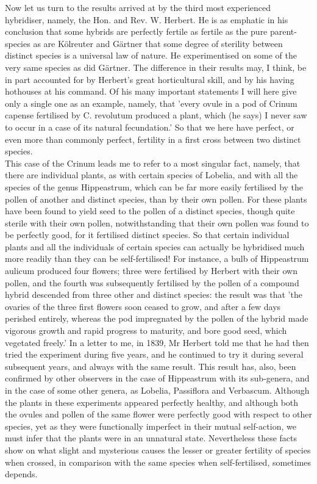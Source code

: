 \indent Now let us turn to the results arrived at by the third most experienced hybridiser, namely, the Hon. and Rev. W. Herbert. He is as emphatic in his conclusion that some hybrids are perfectly fertile as fertile as the pure parent-species as are K\"{o}lreuter and G\"{a}rtner that some degree of sterility between distinct species is a universal law of nature. He experimentised on some of the very same species as did G\"{a}rtner. The difference in their results may, I think, be in part accounted for by Herbert's great horticultural skill, and by his having hothouses at his command. Of his many important statements I will here give only a single one as an example, namely, that 'every ovule in a pod of Crinum capense fertilised by C. revolutum produced a plant, which (he says) I never saw to occur in a case of its natural fecundation.' So that we here have perfect, or even more than commonly perfect, fertility in a first cross between two distinct species.\\
\indent This case of the Crinum leads me to refer to a most singular fact, namely, that there are individual plants, as with certain species of Lobelia, and with all the species of the genus Hippeastrum, which can be far more easily fertilised by the pollen of another and distinct species, than by their own pollen. For these plants have been found to yield seed to the pollen of a distinct species, though quite sterile with their own pollen, notwithstanding that their own pollen was found to be perfectly good, for it fertilised distinct species. So that certain individual plants and all the individuals of certain species can actually be hybridised much more readily than they can be self-fertilised! For instance, a bulb of Hippeastrum aulicum produced four flowers; three were fertilised by Herbert with their own pollen, and the fourth was subsequently fertilised by the pollen of a compound hybrid descended from three other and distinct species: the result was that 'the ovaries of the three first flowers soon ceased to grow, and after a few days perished entirely, whereas the pod impregnated by the pollen of the hybrid made vigorous growth and rapid progress to maturity, and bore good seed, which vegetated freely.' In a letter to me, in 1839, Mr Herbert told me that he had then tried the experiment during five years, and he continued to try it during several subsequent years, and always with the same result. This result has, also, been confirmed by other observers in the case of Hippeastrum with its sub-genera, and in the case of some other genera, as Lobelia, Passiflora and Verbascum. Although the plants in these experiments appeared perfectly healthy, and although both the ovules and pollen of the same flower were perfectly good with respect to other species, yet as they were functionally imperfect in their mutual self-action, we must infer that the plants were in an unnatural state. Nevertheless these facts show on what slight and mysterious causes the lesser or greater fertility of species when crossed, in comparison with the same species when self-fertilised, sometimes depends.\\
